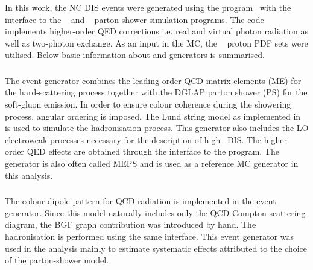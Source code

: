 In this work, the NC DIS events were generated using the \heracles program~\cite{cpc:69:155} with the \djangoh~\cite{cpc:81:381} interface to the \lepto~\cite{Ingelman:1996mq} and \ariadne~\cite{cpc:71:15,Lonnblad:1994wk} parton-shower simulation programs. The \djangoh code implements higher-order QED corrections i.e. real and virtual photon radiation as well as two-photon exchange. As an input in the MC, the \cteqfived~\cite{pr:d51:4763} proton PDF sets were utilised. Below basic information about \lepto and \ariadne generators is summarised.

\subsubsection{\lepto}
The \lepto event generator combines the leading-order QCD matrix elements (ME) for the hard-scattering process together with the DGLAP parton shower (PS) for the soft-gluon emission. In order to ensure colour coherence during the showering process, angular ordering is imposed. The Lund string model as implemented in \jetset~\cite{cpc:43:367} is used to simulate the hadronisation process. This generator also includes the LO electroweak processes necessary for the description of high-\qsq~DIS. The higher-order QED effects are obtained through the interface to the \heracles program. The \lepto generator is also often called MEPS and is used as a reference MC generator in this analysis.
\subsubsection{\ariadne}
The colour-dipole pattern for QCD radiation is implemented in the \ariadne event generator. Since this model naturally includes only the QCD Compton scattering diagram, the BGF graph contribution was introduced by hand. The hadronisation is performed using the same \jetset interface. This event generator was used in the analysis mainly to estimate systematic effects attributed to the choice of the parton-shower model.
